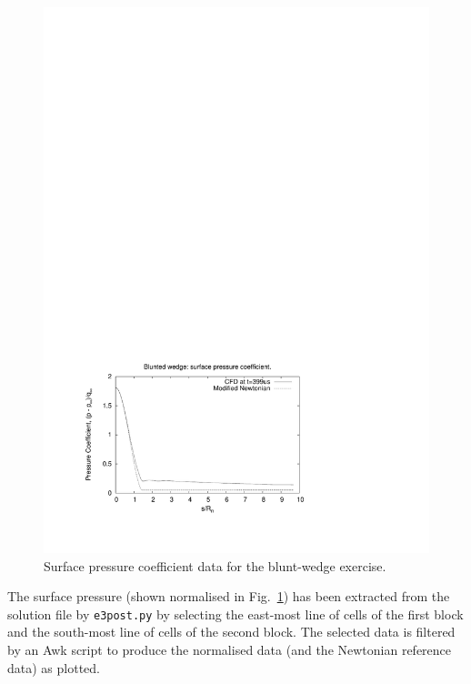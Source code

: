\begin{figure}[htbp]
\begin{center}
\includegraphics[width=12cm,viewport=64 61 401 291,clip=true]{../2D/blunt-wedge/bw_surface_pressure.pdf}
\end{center}
\caption{Surface pressure coefficient data for the blunt-wedge exercise.}
\label{bw-surface-pressure-fig}
\end{figure}

\medskip
The surface pressure (shown normalised in Fig.~\ref{bw-surface-pressure-fig})
has been extracted from the solution file by \texttt{e3post.py} by selecting the
east-most line of cells of the first block and the south-most line of cells
of the second block.
The selected data is filtered by an Awk script to produce the normalised data
(and the Newtonian reference data) as plotted.

